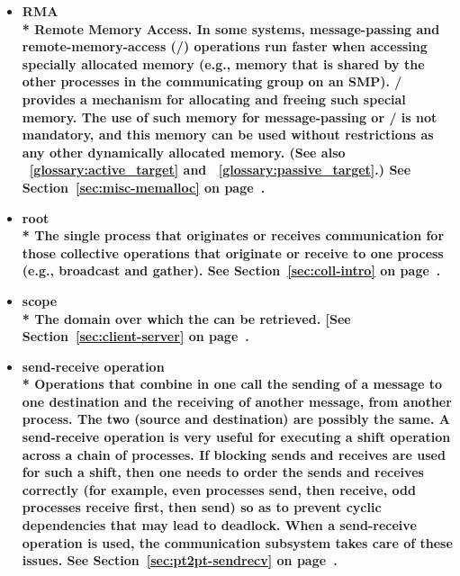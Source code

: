 \begin{itemize}
\label{glossary:RMA}
\item \bf{ RMA} \\*
Remote Memory Access.
In some systems, message-passing and remote-memory-access (\RMA/) operations
run faster when accessing specially allocated memory (e.g., memory that is
shared by the other processes in the communicating group on an SMP).  \MPI/
provides a mechanism for allocating and freeing such special memory.  The use
of such memory for message-passing or \RMA/ is not mandatory, and this memory
can be used without restrictions as any other dynamically allocated memory.
(See also ~\ref{glossary:active_target} and ~\ref{glossary:passive_target}.)
See Section~\ref{sec:misc-memalloc} on page~\pageref{sec:misc-memalloc}.

\label{glossary:root}
\item \bf{ root} \\*
The single process that originates or receives communication for those collective
operations that originate or receive to one process (e.g., broadcast and gather). 
See Section~\ref{sec:coll-intro} on page~\pageref{sec:coll-intro}.

\label{glossary:scope}
\item \bf{ scope} \\*
The domain over which the  
can be retrieved.
[See Section~\ref{sec:client-server} on page~\pageref{sec:client-server}.

\label{glossary:send-receive_operation}
\item \bf{ send-receive operation} \\*
Operations that combine in one call the sending of a
message to one destination and the receiving of another message, from
another process.  The two (source and destination) are possibly the same.
A send-receive operation is
very useful for executing a shift operation across a chain of
processes.  If blocking sends and receives are used for such a shift,
then one needs to order the sends and receives correctly (for
example, even processes
send, then receive, odd processes receive first, then send) so as to prevent
cyclic dependencies that may lead to deadlock.  When a send-receive
operation is used, the communication subsystem takes care of
these issues.
See Section~\ref{sec:pt2pt-sendrecv} on page~\pageref{sec:pt2pt-sendrecv}.


\end{itemize}
